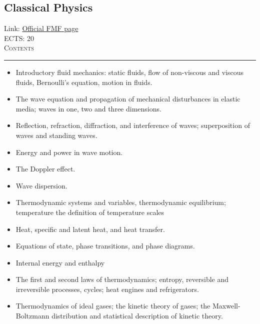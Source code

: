 \documentclass[11pt, a4paper]{article}
\newenvironment{course}[3]{
\subsection{#1}%
Link: \href{#2}{Official FMF page}\\%
ECTS: #3%
\vspace{1ex}
\\
{\large \textsc{Contents}}\\[-0.9ex]%
\rule{\textwidth}{0.5pt}
\vspace{-3ex}
}
{}
\newenvironment{chapter}[1]{
\begin{tcolorbox}[title=#1, breakable]
}
{\end{tcolorbox}}
\begin{document}
\begin{course}{Classical Physics}{https://www.fmf.uni-lj.si/en/study-physics/programmes/1fiz/2020/7000777/courses/1154/}{20}
\begin{chapter}{Mechanics}
\begin{itemize}
        \item Introductory fluid mechanics: static fluids, flow of non-viscous and viscous fluids, Bernoulli's equation, motion in fluids. 
    \end{itemize}

\end{chapter}

\begin{chapter}{Mechanical waves}
    \begin{itemize}
        \item The wave equation and propagation of mechanical disturbances in elastic media; waves in one, two and three dimensions.

        \item Reflection, refraction, diffraction, and interference of waves; superposition of waves and standing waves.

        \item Energy and power in wave motion.

        \item The Doppler effect.

        \item Wave dispersion.
        
    \end{itemize}
\end{chapter}

\begin{chapter}{Introduction to classical thermodynamics}
    \begin{itemize}
    
        \item Thermodynamic systems and variables, thermodynamic equilibrium; temperature the definition of temperature scales
        \item Heat, specific and latent heat, and heat transfer. 
        \item Equations of state, phase transitions, and phase diagrams.
        \item Internal energy and enthalpy
        \item The first and second laws of thermodynamics; entropy, reversible and irreversible processes, cycles; heat engines and refrigerators.
        \item Thermodynamics of ideal gases; the kinetic theory of gases; the Maxwell-Boltzmann distribution and statistical description of kinetic theory. 
    
    \end{itemize}
\end{chapter}


\end{course}
\end{document}
